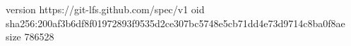 version https://git-lfs.github.com/spec/v1
oid sha256:200af3b6df8f01972893f9535d2ce307bc5748e5cb71dd4e73d9714c8ba0f8ae
size 786528
